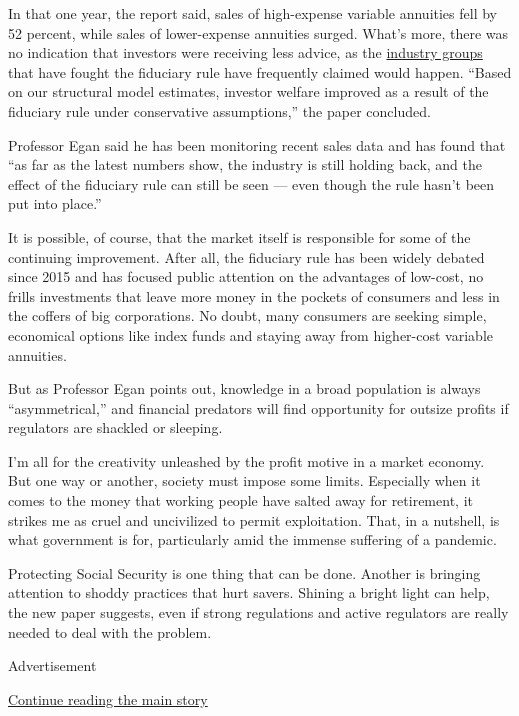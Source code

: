 In that one year, the report said, sales of high-expense variable
annuities fell by 52 percent, while sales of lower-expense annuities
surged. What's more, there was no indication that investors were
receiving less advice, as the
\href{https://www.sifma.org/resources/news/sifma-submits-comments-and-new-evidence-of-the-dol-fiduciary-rules-negative-impact-on-retirement-savers/}{industry
groups} that have fought the fiduciary rule have frequently claimed
would happen. ``Based on our structural model estimates, investor
welfare improved as a result of the fiduciary rule under conservative
assumptions,'' the paper concluded.

Professor Egan said he has been monitoring recent sales data and has
found that ``as far as the latest numbers show, the industry is still
holding back, and the effect of the fiduciary rule can still be seen ---
even though the rule hasn't been put into place.''

It is possible, of course, that the market itself is responsible for
some of the continuing improvement. After all, the fiduciary rule has
been widely debated since 2015 and has focused public attention on the
advantages of low-cost, no frills investments that leave more money in
the pockets of consumers and less in the coffers of big corporations. No
doubt, many consumers are seeking simple, economical options like index
funds and staying away from higher-cost variable annuities.

But as Professor Egan points out, knowledge in a broad population is
always ``asymmetrical,'' and financial predators will find opportunity
for outsize profits if regulators are shackled or sleeping.

I'm all for the creativity unleashed by the profit motive in a market
economy. But one way or another, society must impose some limits.
Especially when it comes to the money that working people have salted
away for retirement, it strikes me as cruel and uncivilized to permit
exploitation. That, in a nutshell, is what government is for,
particularly amid the immense suffering of a pandemic.

Protecting Social Security is one thing that can be done. Another is
bringing attention to shoddy practices that hurt savers. Shining a
bright light can help, the new paper suggests, even if strong
regulations and active regulators are really needed to deal with the
problem.

Advertisement

\protect\hyperlink{after-bottom}{Continue reading the main story}

